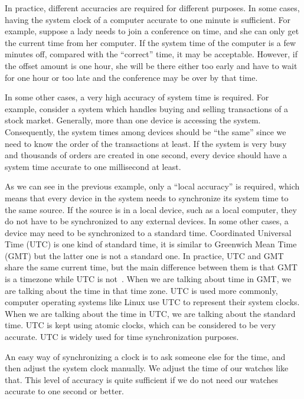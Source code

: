 In practice, different accuracies are required for different purposes. 
In some cases, having the system clock of a computer accurate to one
minute is sufficient. For example, suppose a lady needs to join a conference on
time, and she can only get the current time from her computer. If the system
time of the computer is a few minutes off, compared with the ``correct'' time,
it may be acceptable. However, if the offset amount is one hour, she will be
there either too early and have to wait for one hour or too late and the
conference may be over by that time.

In some other cases, a very high accuracy of system time is required. For
example, consider a system which handles buying and selling transactions of a
stock market.  Generally, more than one device is accessing the system.
Consequently, the system times among devices should be ``the same'' since we
need to know the order of the transactions at least. If the system is very busy
and thousands of orders are created in one second, every device should have a
system time accurate to one millisecond at least.

As we can see in the previous example, only a ``local accuracy'' is required,
which means that every device in the system needs to synchronize its system
time to the same source. If the source is in a local device, such as a local
computer, they do not
have to be synchronized to any external devices. In some other cases, a device
may need to be synchronized to a standard time. 
Coordinated Universal Time (UTC) is one kind of standard time, it is similar 
to Greenwich Mean Time (GMT) but the latter one is not a standard one. 
In practice, UTC and GMT share the same current time, but the main difference
between them is that GMT is a timezone while UTC is not~\cite{utc}. When we are
talking about time in GMT\null, we are talking about the time in that time
zone.  UTC is used more commonly, computer operating systems like Linux use UTC
to represent their system clocks. When we are talking about the time in UTC, we
are talking about the standard time. UTC is kept using atomic clocks, which can
be considered to be very accurate. UTC is widely used for time synchronization
purposes.

An easy way of synchronizing a clock is to ask someone else for the time, and
then adjust the system clock manually. We adjust the time of our
watches like that. This level of accuracy is quite sufficient if we do not need
our watches accurate to one second or better. 


